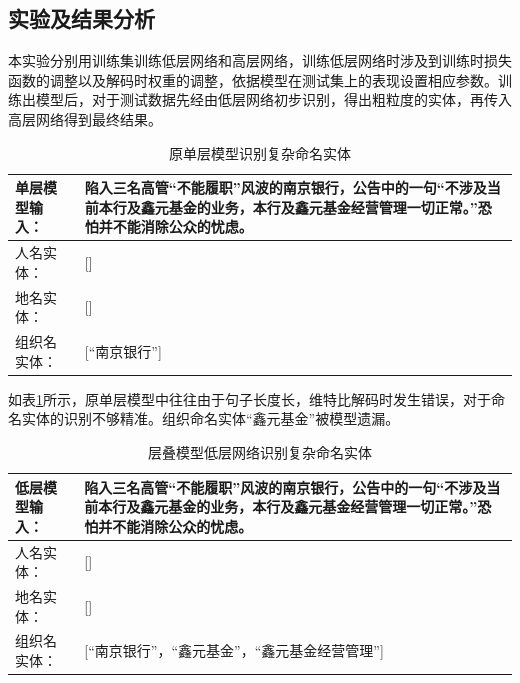 \documentclass[winfonts,master,oneside,nobackinfo]{njuthesis}
\begin{document}
\subsection{实验及结果分析}

本实验分别用训练集训练低层网络和高层网络，训练低层网络时涉及到训练时损失函数的调整以及解码时权重的调整，依据模型在测试集上的表现设置相应参数。训练出模型后，对于测试数据先经由低层网络初步识别，得出粗粒度的实体，再传入高层网络得到最终结果。

\begin{table}[h]
\centering
\begin{tabularx}{0.95\textwidth}{|l|X|}
\hline
单层模型输入： & 陷入三名高管“不能履职”风波的南京银行，公告中的一句“不涉及当前本行及鑫元基金的业务，本行及鑫元基金经营管理一切正常。”恐怕并不能消除公众的忧虑。 \\ \hline
人名实体：             & {[}{]}                                                           \\ \hline
地名实体：             & {[}{]}                                                           \\ \hline
组织名实体：            & {[}“南京银行”{]}                   \\ \hline
\end{tabularx}
\caption{原单层模型识别复杂命名实体}
\label{one-layer}
\end{table}

如表\ref{one-layer}所示，原单层模型中往往由于句子长度长，维特比解码时发生错误，对于命名实体的识别不够精准。组织命名实体“鑫元基金”被模型遗漏。

\begin{table}[h]
\centering
\begin{tabularx}{0.95\textwidth}{|l|X|}
\hline
低层模型输入： & 陷入三名高管“不能履职”风波的南京银行，公告中的一句“不涉及当前本行及鑫元基金的业务，本行及鑫元基金经营管理一切正常。”恐怕并不能消除公众的忧虑。 \\ \hline
人名实体：             & {[}{]}                                                           \\ \hline
地名实体：             & {[}{]}                                                           \\ \hline
组织名实体：            & {[}“南京银行”，“鑫元基金”，“鑫元基金经营管理”{]}                  \\ \hline
\end{tabularx}
\caption{层叠模型低层网络识别复杂命名实体}
\label{prob1}
\end{table}
\end{document}
